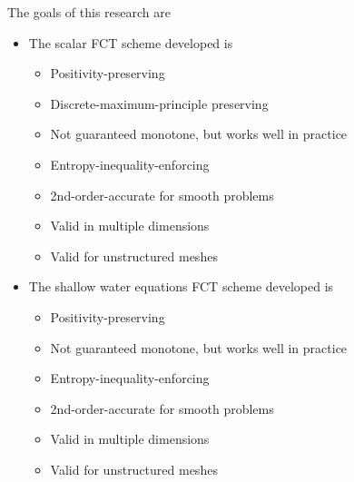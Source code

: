 The goals of this research are
\begin{itemize}
  \item The scalar FCT scheme developed is
    \begin{itemize}
      \item Positivity-preserving
      \item Discrete-maximum-principle preserving
      \item Not guaranteed monotone, but works well in practice
      \item Entropy-inequality-enforcing
      \item 2nd-order-accurate for smooth problems
      \item Valid in multiple dimensions
      \item Valid for unstructured meshes
    \end{itemize}
  \item The shallow water equations FCT scheme developed is
    \begin{itemize}
      \item Positivity-preserving
      \item Not guaranteed monotone, but works well in practice
      \item Entropy-inequality-enforcing
      \item 2nd-order-accurate for smooth problems
      \item Valid in multiple dimensions
      \item Valid for unstructured meshes
    \end{itemize}
\end{itemize}
